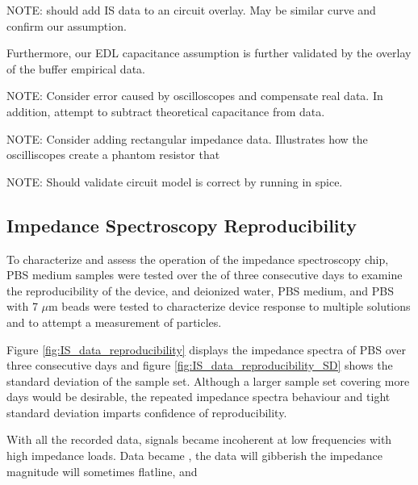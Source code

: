\par NOTE: should add IS data to an circuit overlay. May be similar curve and confirm our assumption.

\par Furthermore, our EDL capacitance assumption is further validated by the overlay of the buffer empirical data.

\par NOTE: Consider error caused by oscilloscopes and compensate real data. In addition, attempt to subtract theoretical capacitance from data.

\par NOTE: Consider adding rectangular impedance data. Illustrates how the oscilliscopes create a phantom resistor that 

\par NOTE: Should validate circuit model is correct by running in spice.



\subsection{Impedance Spectroscopy Reproducibility}

\par To characterize and assess the operation of the impedance spectroscopy chip, PBS medium samples were tested over the of three consecutive days to examine the reproducibility of the device, and deionized water, PBS medium, and PBS with 7 $\mu$m beads were tested to characterize device response to multiple solutions and to attempt a measurement of particles.

\par Figure \ref{fig:IS_data_reproducibility} displays the impedance spectra of PBS over three consecutive days and figure \ref{fig:IS_data_reproducibility_SD} shows the standard deviation of the sample set. Although a larger sample set covering more days would be desirable, the repeated impedance spectra behaviour and tight standard deviation imparts confidence of reproducibility.

\par With all the recorded data, signals became incoherent at low frequencies with high impedance loads. Data became , the data will gibberish the impedance magnitude will sometimes flatline, and 

